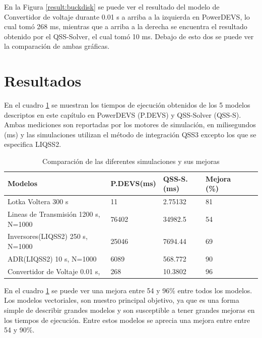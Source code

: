 En la Figura \ref{result:buckdisk} se puede ver el resultado del modelo de Convertidor de voltaje durante 0.01 s a arriba a la izquierda en PowerDEVS, 
	lo cual tomó 268 ms, mientras que a arriba a la derecha se encuentra el resultado obtenido por el QSS-Solver, el cual tomó 10 ms.  Debajo de esto dos se 
	puede ver la comparación de ambas gráficas.

\section{Resultados}

	En el cuadro \ref{tab:result} se muestran los tiempos de ejecución obtenidos de los 5 modelos descriptos en este capítulo en  
	PowerDEVS (P.DEVS) y QSS-Solver (QSS-S). Ambas mediciones son reportadas por los motores de simulación, en milisegundos (ms) y
	las simulaciones utilizan el método de integración QSS3 excepto los que se especifica LIQSS2.

\begin{table}[H]
\centering	
\begin{tabular}{llllll}
\toprule
{\bf Modelos}            &  {\bf P.DEVS(ms)} & {\bf QSS-S. (ms)} & {\bf Mejora (\%)} \\
\toprule
Lotka  Voltera 300 s      		& 11            & 2.75132         & 81 \\
Lineas de Transmisión 1200 s, N=1000     & 76402         & 34982.5         & 54          \\
Inversores(LIQSS2) 250 s, N=1000   	& 25046         & 7694.44         & 69        \\
ADR(LIQSS2) 10 s, N=1000 		& 6089          & 568.772         & 90        \\
Convertidor de Voltaje 0.01 s,        	& 268           & 10.3802         & 96         

\end{tabular}
\caption{Comparación de las diferentes simulaciones y sus mejoras}\label{tab:result}
\end{table}

	En el cuadro \ref{tab:result} se puede ver una mejora entre 54 y 96\% entre todos los modelos.
	Los modelos vectoriales, son nuestro principal objetivo, ya que es una forma simple de describir grandes modelos y son susceptible a tener grandes mejoras
	en los tiempos de ejecución. Entre estos modelos se aprecia una mejora entre entre 54 y 90\%.

